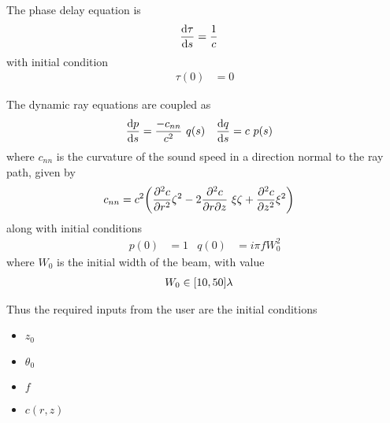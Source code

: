 The phase delay equation is
\begin{align}
	\dv{\tau}{s} &= \frac{1}{c}
\end{align}
with initial condition
\begin{align}
	\tau(0) &= 0
\end{align}

The dynamic ray equations are coupled as
\begin{align}
	\dv{p}{s} &= \frac{-c_{nn}}{c^2}\ q(s) &
	\dv{q}{s} &= c\ p(s)
\end{align}
where $c_{nn}$ is the curvature of the sound speed in a direction normal to the ray path, given by
\begin{align}
	c_{nn} &= c^2 \Par{\pdv[2]{c}{r} \zeta^2 - 2 \pdv[2]{c}{r}{z}\ \xi \zeta + \pdv[2]{c}{z} \xi^2}
\end{align}
along with initial conditions
\begin{align}
	p(0) &= 1 & q(0) &= i\pi f W_0^2
\end{align}
where $W_0$ is the initial width of the beam, with value
\begin{align}
	W_0 &\in { \left[ {10, 50} \right] } \lambda
\end{align}

Thus the required inputs from the user are the initial conditions
\begin{itemize}
	\item $z_0$
	\item $\theta_0$
	\item $f$
	\item $c(r, z)$
\end{itemize}